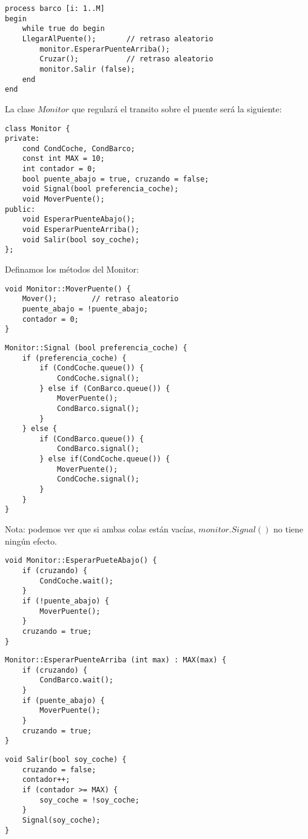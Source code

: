 \documentclass[11pt,a4paper]{article}
\begin{document}
\begin{enumerate}
\begin{lstlisting}
process barco [i: 1..M]
begin
	while true do begin
	LlegarAlPuente();		// retraso aleatorio
		monitor.EsperarPuenteArriba();
		Cruzar();			// retraso aleatorio
		monitor.Salir (false);
	end
end
\end{lstlisting}

La clase $Monitor$ que regulará el transito sobre el puente será la siguiente:

\begin{lstlisting}
class Monitor {
private:
	cond CondCoche, CondBarco;
	const int MAX = 10;
	int contador = 0;
	bool puente_abajo = true, cruzando = false;
	void Signal(bool preferencia_coche);
	void MoverPuente();
public:
	void EsperarPuenteAbajo();
	void EsperarPuenteArriba();
	void Salir(bool soy_coche);
};
\end{lstlisting}

Definamos los métodos del Monitor:

\begin{lstlisting}
void Monitor::MoverPuente() {
	Mover();		// retraso aleatorio
	puente_abajo = !puente_abajo;
	contador = 0;
}
\end{lstlisting}

\begin{lstlisting}
Monitor::Signal (bool preferencia_coche) {
	if (preferencia_coche) {
		if (CondCoche.queue()) {
			CondCoche.signal();
		} else if (ConBarco.queue()) {
			MoverPuente();
			CondBarco.signal();		
		}
	} else {
		if (CondBarco.queue()) {
			CondBarco.signal();
		} else if(CondCoche.queue()) {
			MoverPuente();		
			CondCoche.signal();
		}
	}
}
\end{lstlisting}

Nota: podemos ver que si ambas colas están vacías, $monitor.Signal()$ no tiene ningún efecto.

\begin{lstlisting}
void Monitor::EsperarPueteAbajo() {
	if (cruzando) {
		CondCoche.wait();
	}
	if (!puente_abajo) {
		MoverPuente();
	}
	cruzando = true;
}
\end{lstlisting}

\begin{lstlisting}
Monitor::EsperarPuenteArriba (int max) : MAX(max) {
	if (cruzando) {
		CondBarco.wait();
	}
	if (puente_abajo) {
		MoverPuente();
	}
	cruzando = true;
}
\end{lstlisting}

\begin{lstlisting}
void Salir(bool soy_coche) {
	cruzando = false;
	contador++;
	if (contador >= MAX) {
		soy_coche = !soy_coche;
	} 
	Signal(soy_coche);
}
\end{lstlisting}


\end{enumerate}
\end{document}
